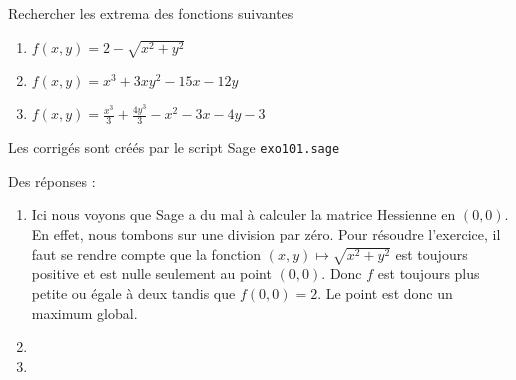 \begin{example}     \label{exZHGRooTQpVpq}
    

	 Rechercher les extrema des fonctions suivantes
	\begin{enumerate}

		\item
			$f(x,y)=2-\sqrt{x^2+y^2}$
		\item
			$f(x,y)=x^3+3xy^2-15x-12y$
		\item
			$f(x,y)=\frac{ x^3 }{ 3 }+\frac{ 4y^3 }{ 3 }-x^2-3x-4y-3$

	\end{enumerate}




	Les corrigés sont créés par le script Sage \verb+exo101.sage+


	Des réponses :
	
	\begin{enumerate}

		\item

			Ici nous voyons que Sage a du mal à calculer la matrice Hessienne en $(0,0)$. En effet, nous tombons sur une division par zéro. Pour résoudre l'exercice, il faut se rendre compte que la fonction $(x,y)\mapsto\sqrt{x^2+y^2}$ est toujours positive et est nulle seulement au point $(0,0)$. Donc $f$ est toujours plus petite ou égale à deux tandis que $f(0,0)=2$. Le point est donc un maximum global.
		\item

		\item

	\end{enumerate}

\end{example}

